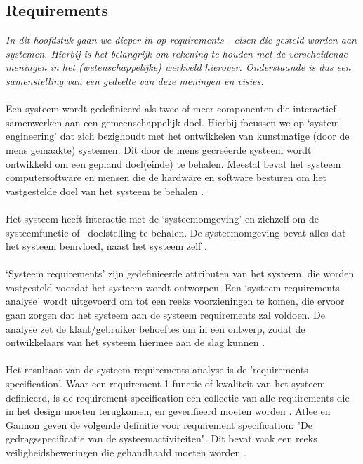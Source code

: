 \documentclass{article}
\begin{document}
  \subsection{Requirements}
    \textit{In dit hoofdstuk gaan we dieper in op requirements - eisen die gesteld worden aan systemen. Hierbij is het belangrijk om rekening te houden met de verscheidende meningen in het (wetenschappelijke) werkveld hierover. Onderstaande is dus een samenstelling van een gedeelte van deze meningen en visies.} \\\\
    Een systeem wordt gedefinieerd als twee of meer componenten die interactief samenwerken aan een gemeenschappelijk doel. Hierbij focussen we op ‘system engineering’ dat zich bezighoudt met het ontwikkelen van kunstmatige (door de mens gemaakte) systemen. Dit door de mens gecreëerde systeem wordt ontwikkeld om een gepland doel(einde) te behalen. Meestal bevat het systeem computersoftware en mensen die de hardware en software besturen om het vastgestelde doel van het systeem te behalen \cite{grady2010system}. \\\\
    Het systeem heeft interactie met de ‘systeemomgeving’ en zichzelf om de systeemfunctie of –doelstelling te behalen. De systeemomgeving bevat alles dat het systeem beïnvloed, naast het systeem zelf \cite{grady2010system}.\\\\
    ‘Systeem requirements’ zijn gedefinieerde attributen van het systeem, die worden vastgesteld voordat het systeem wordt ontworpen. Een ‘systeem requirements analyse’ wordt uitgevoerd om tot een reeks voorzieningen te komen, die ervoor gaan zorgen dat het systeem aan de systeem requirements zal voldoen. De analyse zet de klant/gebruiker behoeftes om in een ontwerp, zodat de ontwikkelaars van het systeem hiermee aan de slag kunnen \cite{grady2010system}. \\\\
    Het resultaat van de systeem requirements analyse is de 'requirements specification'. Waar een requirement 1 functie of kwaliteit van het systeem definieerd, is de requirement specification een collectie van alle requirements die in het design moeten terugkomen, en geverifieerd moeten worden \cite{hooks2015difference}.
    Atlee en Gannon geven de volgende definitie voor requirement specification: "De gedragsspecificatie van de systeemactiviteiten". Dit bevat vaak een reeks veiligheidsbeweringen die gehandhaafd moeten worden \cite{gannon1993state}. \\\\
\end{document}
